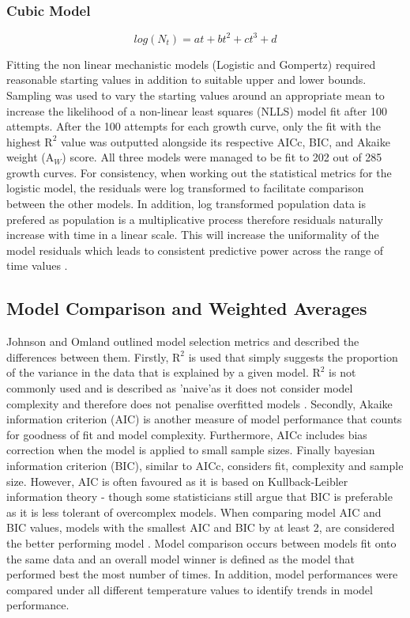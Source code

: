 \documentclass[11pt]{article}
\begin{document}
    \subsubsection{Cubic Model}
    \begin{equation}
        log(N_t) = at + bt^2 + ct^3 + d
    \end{equation}

Fitting the non linear mechanistic models (Logistic and Gompertz) required reasonable starting values in addition to suitable upper and lower bounds. Sampling was used to vary the starting values around an appropriate mean to increase the likelihood of a non-linear least squares (NLLS) model fit after 100 attempts. After the 100 attempts for each growth curve, only the fit with the highest $\mathrm{R}^2$ value was outputted alongside its respective AICc, BIC, and Akaike weight ($\mathrm{A}_{\textit{W}}$) score. All three models were managed to be fit to 202 out of 285 growth curves. For consistency, when working out the statistical metrics for the logistic model, the residuals were log transformed to facilitate comparison between the other models. In addition, log transformed population data is prefered as population is a multiplicative process therefore residuals naturally increase with time in a linear scale. This will increase the uniformality of the model residuals which leads to consistent predictive power across the range of time values \cite{Freckleton2002}.


    \subsection{Model Comparison and Weighted Averages}
Johnson and Omland outlined model selection metrics and described the differences between them. Firstly, $\mathrm{R}^2$ is used that simply suggests the proportion of the variance in the data that is explained by a given model. $\mathrm{R}^2$ is not commonly used and is described as 'naive'as it does not consider model complexity and therefore does not penalise overfitted models \cite{JOHNSON2004101}. Secondly, Akaike information criterion (AIC) is another measure of model performance that counts for goodness of fit and model complexity. Furthermore, AICc includes bias correction when the model is applied to small sample sizes. Finally bayesian information criterion (BIC), similar to AICc, considers fit, complexity and sample size. However, AIC is often favoured as it is based on Kullback-Leibler information theory \cite{JOHNSON2004101} - though some statisticians still argue that BIC is preferable as it is less tolerant of overcomplex models. When comparing model AIC and BIC values, models with the smallest AIC and BIC by at least 2, are considered the better performing model \cite{JOHNSON2004101}. Model comparison occurs between models fit onto the same data and an overall model winner is defined as the model that performed best the most number of times. In addition, model performances were compared under all different temperature values to identify trends in model performance.\\
\end{document}

